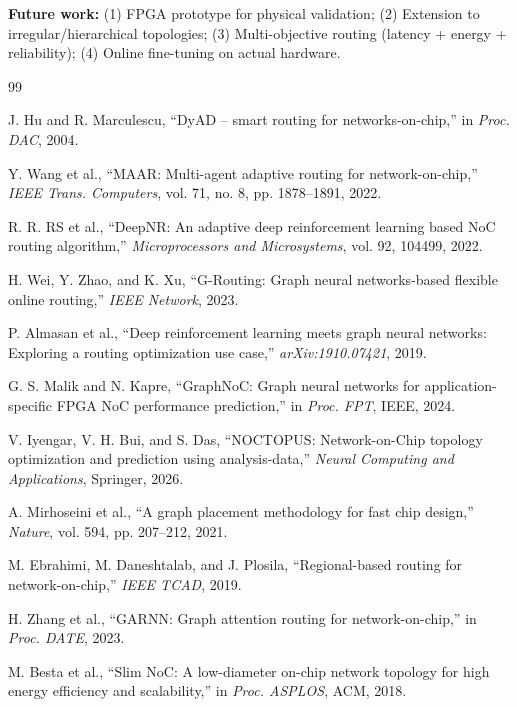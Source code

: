 \documentclass[conference]{IEEEtran}
\begin{document}
\textbf{Future work:} (1) FPGA prototype for physical validation; (2) Extension to irregular/hierarchical topologies; (3) Multi-objective routing (latency + energy + reliability); (4) Online fine-tuning on actual hardware.


\begin{thebibliography}{99}

J. Hu and R. Marculescu, ``DyAD -- smart routing for networks-on-chip,'' in \textit{Proc. DAC}, 2004.

Y. Wang et al., ``MAAR: Multi-agent adaptive routing for network-on-chip,'' \textit{IEEE Trans. Computers}, vol. 71, no. 8, pp. 1878--1891, 2022.

R. R. RS et al., ``DeepNR: An adaptive deep reinforcement learning based NoC routing algorithm,'' \textit{Microprocessors and Microsystems}, vol. 92, 104499, 2022.

H. Wei, Y. Zhao, and K. Xu, ``G-Routing: Graph neural networks-based flexible online routing,'' \textit{IEEE Network}, 2023.

P. Almasan et al., ``Deep reinforcement learning meets graph neural networks: Exploring a routing optimization use case,'' \textit{arXiv:1910.07421}, 2019.

G. S. Malik and N. Kapre, ``GraphNoC: Graph neural networks for application-specific FPGA NoC performance prediction,'' in \textit{Proc. FPT}, IEEE, 2024.

V. Iyengar, V. H. Bui, and S. Das, ``NOCTOPUS: Network-on-Chip topology optimization and prediction using analysis-data,'' \textit{Neural Computing and Applications}, Springer, 2026.

A. Mirhoseini et al., ``A graph placement methodology for fast chip design,'' \textit{Nature}, vol. 594, pp. 207--212, 2021.

M. Ebrahimi, M. Daneshtalab, and J. Plosila, ``Regional-based routing for network-on-chip,'' \textit{IEEE TCAD}, 2019.

H. Zhang et al., ``GARNN: Graph attention routing for network-on-chip,'' in \textit{Proc. DATE}, 2023.

M. Besta et al., ``Slim NoC: A low-diameter on-chip network topology for high energy efficiency and scalability,'' in \textit{Proc. ASPLOS}, ACM, 2018.


\end{thebibliography}
\end{document}
